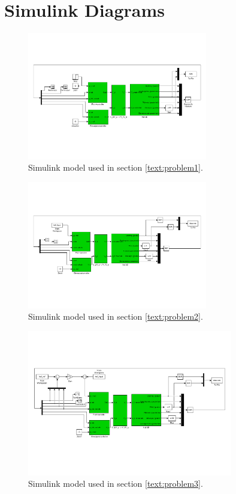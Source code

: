 \section{Simulink Diagrams}\label{sec:simulink}
\begin{figure}[h]
	\centering
		\includegraphics[width = 0.70\textwidth]{figures/1/simulink.pdf}
	\caption{Simulink model used in section \ref{text:problem1}.}
\end{figure}
\begin{figure}[h]
	\centering
		\includegraphics[width = 0.70\textwidth]{figures/2/simulink.pdf}
	\caption{Simulink model used in section \ref{text:problem2}.}
\end{figure}

\begin{figure}[h]
	\centering
		\includegraphics[width = 0.80\textwidth]{figures/3/simulink.pdf}
	\caption{Simulink model used in section \ref{text:problem3}.}
\end{figure}

